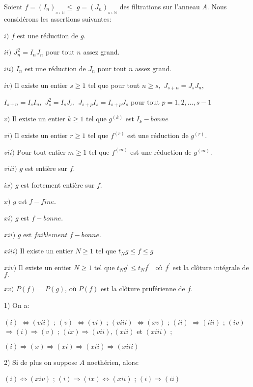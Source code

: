 \begin{montheoreme}
	Soient $f=(I_{n})_{_{n\in \mathbb{N}}}\leq $ $g=(J_{n})_{_{n\in \mathbb{N}}}$ des filtrations sur l'anneau $A.$ Nous
	considérons les assertions suivantes:
	
	$i)$ $f$ est une réduction de $g.$
	
	$ii)$ $J_{n}^{2}=I_{n}J_{n}$ pour tout $n$ assez grand.
	
	$iii)$ $I_{n}$ est une réduction de $J_{n}$ pour tout $n$ assez grand.
	
	$iv)$ Il existe un entier $s\geq 1$ tel que pour tout $n\geq s,$ $J_{s+n}=J_{s}J_{n},$
	
	$I_{s+n}=I_{s}I_{n},$ $J_{s}^{2}=I_{s}J_{s},$ $J_{s+p}I_{s}=I_{s+p}J_{s}$ pour tout $p=1,2,...,s-1$
	
	$v)$ Il existe un entier $k\geq 1$ tel que $g^{(k)}$ est $I_{k}-bonne$
	
	$vi)$ Il existe un entier $r\geq 1$ tel que $f^{(r)}$ est une réduction de $g^{(r)}.$
	
	$vii)$ Pour tout entier $m\geq 1$ tel que $f^{(m)}$ est une réduction de $g^{(m)}.$
	
	$viii)$ $g$ est entière sur $f.$
	
	$ix)$ $g$ est fortement entière sur $f.$
	
	$x)$ $g$ est $f-fine.$
	
	$xi)$ $g$ est $f-bonne.$
	
	$xii)$ $g$ est $faiblement$ $f-bonne.$
	
	$xiii)$ Il existe un entier $N\geq 1$ tel que $t_{N}g\leq f\leq g$
	
	$xiv)$ Il existe un entier $N\geq 1$ tel que $t_{N}g^{\prime }\leq
	t_{N}f^{\prime \text{ }}$ où $f^{\prime }$ est la clôture intégrale de $f.$
	
	$xv)$ $P(f)=P(g)$, où $P(f)$ est la clôture prüférienne de $f.$
	
	1) On a:
	
	$(i)$ $\Longleftrightarrow (vii)$ ; $(v)$ $\Longleftrightarrow (vi)$ ; $(viii)$ $\Longleftrightarrow (xv)$ ; $(ii)$ $\Longrightarrow (iii)$ ; $(iv)$ 
	$\Longrightarrow (i)\Longrightarrow (v)$ ; $(ix)\Longrightarrow (vii),(xii)$
	et $(xiii)$ ;
	
	$(i)\Longrightarrow (x)\Longrightarrow (xi)\Longrightarrow
	(xii)\Longrightarrow (xiii)$
	
	2) Si de plus on suppose $A$ noethérien, alors:
	
	$(i)\Longleftrightarrow (xiv)$ ; $(i)\Longrightarrow (ix)\Longleftrightarrow
	(xii)$ ; $(i)\Longrightarrow (ii)$
	

\end{montheoreme}
